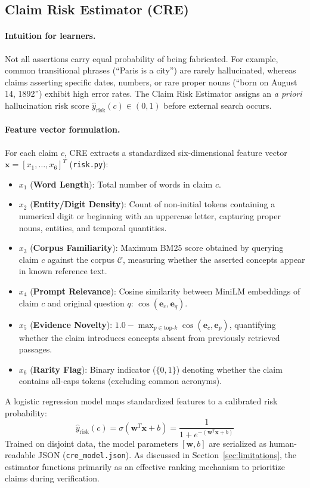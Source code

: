 \subsection{Claim Risk Estimator (CRE)}
\paragraph{Intuition for learners.}
Not all assertions carry equal probability of being fabricated. For example, common transitional phrases (``Paris is a city'') are rarely hallucinated, whereas claims asserting specific dates, numbers, or rare proper nouns (``born on August 14, 1892'') exhibit high error rates. The Claim Risk Estimator assigns an \emph{a priori} hallucination risk score $\hat{y}_{\text{risk}}(c) \in (0, 1)$ before external search occurs.

\paragraph{Feature vector formulation.}
For each claim $c$, CRE extracts a standardized six-dimensional feature vector $\mathbf{x} = [x_1, \dots, x_6]^T$ (\texttt{risk.py}):
\begin{itemize}
  \item $x_1$ (\textbf{Word Length}): Total number of words in claim $c$.
  \item $x_2$ (\textbf{Entity/Digit Density}): Count of non-initial tokens containing a numerical digit or beginning with an uppercase letter, capturing proper nouns, entities, and temporal quantities.
  \item $x_3$ (\textbf{Corpus Familiarity}): Maximum BM25 score obtained by querying claim $c$ against the corpus $\mathcal{C}$, measuring whether the asserted concepts appear in known reference text.
  \item $x_4$ (\textbf{Prompt Relevance}): Cosine similarity between MiniLM embeddings of claim $c$ and original question $q$: $\cos(\mathbf{e}_c, \mathbf{e}_q)$.
  \item $x_5$ (\textbf{Evidence Novelty}): $1.0 - \max_{p \in \text{top-}k} \cos(\mathbf{e}_c, \mathbf{e}_p)$, quantifying whether the claim introduces concepts absent from previously retrieved passages.
  \item $x_6$ (\textbf{Rarity Flag}): Binary indicator ($\{0, 1\}$) denoting whether the claim contains all-caps tokens (excluding common acronyms).
\end{itemize}

A logistic regression model maps standardized features to a calibrated risk probability:
\begin{equation}
  \hat{y}_{\text{risk}}(c) = \sigma(\mathbf{w}^T \mathbf{x} + b) = \frac{1}{1 + e^{-(\mathbf{w}^T \mathbf{x} + b)}}
\end{equation}
Trained on disjoint data, the model parameters $[\mathbf{w}, b]$ are serialized as human-readable JSON (\texttt{cre\_model.json}). As discussed in Section~\ref{sec:limitations}, the estimator functions primarily as an effective ranking mechanism to prioritize claims during verification.

